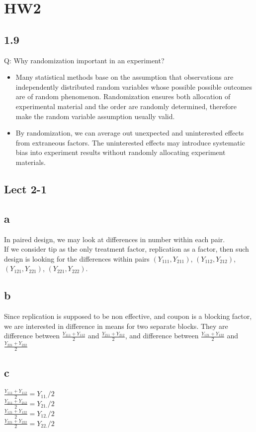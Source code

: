 \documentclass[11pt,letterpaper]{article}
\begin{document}
\section*{HW2}
\subsection*{1.9}
Q: Why randomization important in an experiment?
\begin{itemize}
\item Many statistical methods base on the assumption that observations are independently distributed random variables whose possible possible outcomes are of random phenomenon. Randomization ensures both allocation of experimental material and the order are randomly determined, therefore make the random variable assumption usually valid. 
\item By randomization, we can average out unexpected and uninterested effects from extraneous factors. The uninterested effects may introduce systematic bias into experiment results without randomly allocating experiment materials. 
\end{itemize}

\subsection*{Lect 2-1}
\subsection*{a}
In paired design, we may look at differences in number within each pair. \\
If we consider tip as the only treatment factor, replication as a factor, then such design is looking for the differences within pairs $(Y_{111}, Y_{211})$, $(Y_{112}, Y_{212})$, $(Y_{121}, Y_{221})$, $(Y_{221}, Y_{222})$.

\subsection*{b}
Since replication is supposed to be non effective, and coupon is a blocking factor, we are interested in difference in means for two separate blocks.
They are difference between $\frac{Y_{111} + Y_{112}}{2}$ and $\frac{Y_{211} + Y_{212}}{2}$, and difference between $\frac{Y_{121} + Y_{122}}{2}$ and $\frac{Y_{221} + Y_{222}}{2}$

\subsection*{c}
$\frac{Y_{111} + Y_{112}}{2} = Y_{11.} / 2$ \\
$\frac{Y_{211} + Y_{212}}{2} = Y_{21.} / 2$\\
$\frac{Y_{121} + Y_{122}}{2} = Y_{12.} / 2$ \\
$\frac{Y_{221} + Y_{222}}{2} = Y_{22.} / 2$\\
\end{document}
